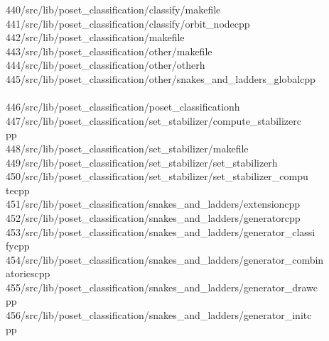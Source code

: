 \begin{tabbing}
440\>/src/lib/poset\_classification/classify/makefile\\[0pt]
441\>/src/lib/poset\_classification/classify/orbit\_nodecpp\\[0pt]
442\>/src/lib/poset\_classification/makefile\\[0pt]
443\>/src/lib/poset\_classification/other/makefile\\[0pt]
444\>/src/lib/poset\_classification/other/otherh\\[0pt]
445\>/src/lib/poset\_classification/other/snakes\_and\_ladders\_globalcpp\\[0pt]
\>\\[0pt]
446\>/src/lib/poset\_classification/poset\_classificationh\\[0pt]
447\>/src/lib/poset\_classification/set\_stabilizer/compute\_stabilizerc\\[0pt]
\>pp\\[0pt]
448\>/src/lib/poset\_classification/set\_stabilizer/makefile\\[0pt]
449\>/src/lib/poset\_classification/set\_stabilizer/set\_stabilizerh\\[0pt]
450\>/src/lib/poset\_classification/set\_stabilizer/set\_stabilizer\_compu\\[0pt]
\>tecpp\\[0pt]
451\>/src/lib/poset\_classification/snakes\_and\_ladders/extensioncpp\\[0pt]
452\>/src/lib/poset\_classification/snakes\_and\_ladders/generatorcpp\\[0pt]
453\>/src/lib/poset\_classification/snakes\_and\_ladders/generator\_classi\\[0pt]
\>fycpp\\[0pt]
454\>/src/lib/poset\_classification/snakes\_and\_ladders/generator\_combin\\[0pt]
\>atoricscpp\\[0pt]
455\>/src/lib/poset\_classification/snakes\_and\_ladders/generator\_drawc\\[0pt]
\>pp\\[0pt]
456\>/src/lib/poset\_classification/snakes\_and\_ladders/generator\_initc\\[0pt]
\>pp\\[0pt]

\end{tabbing}
